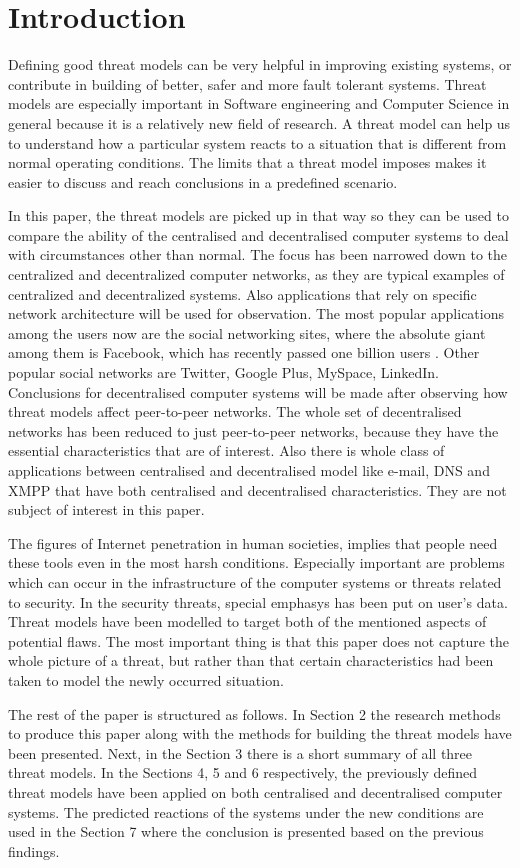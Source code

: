 \newpage
\section{Introduction}
Defining good threat models can be very helpful in improving existing systems, or contribute in building of better, safer and more fault tolerant systems.
Threat models are especially important in Software engineering and Computer Science in general because it is a relatively new field of research.
A threat model can help us to understand how a particular system reacts to a situation that is different from normal operating conditions.
The limits that a threat model imposes makes it easier to discuss and reach conclusions in a predefined scenario.

In this paper, the threat models are picked up in that way so they can be used to compare the ability of the centralised and decentralised computer systems to deal with circumstances other than normal.
The focus has been narrowed down to the centralized and decentralized computer networks, as they are typical examples of centralized and decentralized systems. Also applications that rely on specific network architecture will be used for observation.
The most popular applications among the users now are the social networking sites, where the absolute giant among them is Facebook, which has recently passed one billion users \cite{web:facebookpassesbillion}. Other popular social networks are Twitter, Google Plus, MySpace, LinkedIn.
Conclusions for decentralised computer systems will be made after observing how threat models affect peer-to-peer networks.
The whole set of decentralised networks has been reduced to just peer-to-peer networks, because they have the essential characteristics that are of interest.
Also there is whole class of applications between centralised and decentralised model like e-mail, DNS and XMPP that have both centralised and decentralised characteristics.
They are not subject of interest in this paper.

The figures of Internet penetration \cite{web:internetworldstats} in human societies, implies that people need these tools even in the most harsh conditions.
Especially important are problems which can occur in the infrastructure of the computer systems or threats related to security.
In the security threats, special emphasys has been put on user's data.
Threat models have been modelled to target both of the mentioned aspects of potential flaws.
The most important thing is that this paper does not capture the whole picture of a threat, but rather than that certain characteristics had been taken to model the newly occurred situation.

The rest of the paper is structured as follows.
In Section 2 the research methods to produce this paper along with the methods for building the threat models have been presented.
Next, in the Section 3 there is a short summary of all three threat models.
In the Sections 4, 5 and 6 respectively, the previously defined threat models have been applied on both centralised and decentralised computer systems.
The predicted reactions of the systems under the new conditions are used in the Section 7 where the conclusion is presented based on the previous findings.
